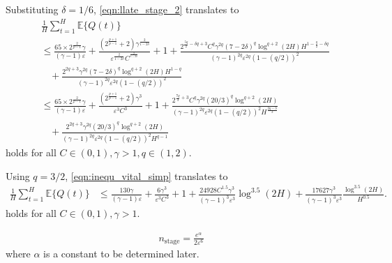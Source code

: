 \documentclass[12pt,draftcls, onecolumn]{IEEEtran}
\begin{document}
Substituting $\delta = 1/6$, \eqref{eqn:llate_stage_2} translates to
\begin{align}\label{eqn:inequ_vital_simp}
    &\frac{1}{H}\sum_{t = 1}^H \mathbb{E}\{Q(t)\} \nonumber\\&\leq  \frac{65\times2^{\frac{2}{p-1}}\gamma }{(\gamma-1) \varepsilon}+\frac{\left(2^{\frac{p+1}{p-1}}+2\right)\gamma^{\frac{2}{1-2\delta}}}{\varepsilon^{\frac{2}{1-2\delta}}C^{^{\frac{2}{1-2\delta}}}}+1 +\frac{2^{\frac{5q}{2}-\delta q+3}C^q\gamma^{2q}(7-2\delta)^q\log^{q+2}(2H)H^{1-\frac{q}{2}-\delta q}}{(\gamma-1)^{2q}\varepsilon^{2q}(1-(q/2))^2}  \nonumber\\&\ \ \ \ + \frac{2^{2q +3}\gamma^{2q}(7-2\delta)^q\log^{q+2}(2H)H^{1-q}}{(\gamma-1)^{2q}\varepsilon^{2q}(1-(q/2))^2} \nonumber\\& \leq \frac{65\times2^{\frac{2}{p-1}}\gamma }{(\gamma-1) \varepsilon}+\frac{\left(2^{\frac{p+1}{p-1}}+2\right)\gamma^{3}}{\varepsilon^{3}C^{3}}+1 +\frac{2^{\frac{7q}{3}+3}C^q\gamma^{2q}(20/3)^q\log^{q+2}(2H)}{(\gamma-1)^{2q}\varepsilon^{2q}(1-(q/2))^2H^{\frac{2q-3}{3}}}  \nonumber\\&\ \ \ \ + \frac{2^{2q +3}\gamma^{2q}(20/3)^q\log^{q+2}(2H)}{(\gamma-1)^{2q}\varepsilon^{2q}(1-(q/2))^2H^{q-1}}
\end{align}
holds for all $C \in (0,1),\gamma>1 , q \in (1,2)$.

Using $q = 3/2$, \eqref{eqn:inequ_vital_simp} translates to
\begin{align}\label{eqn:bound_2}
 \frac{1}{H}\sum_{t = 1}^H \mathbb{E}\{Q(t)\} &\leq \frac{130\gamma }{(\gamma-1)\varepsilon}+\frac{6\gamma^{3}}{\varepsilon^{3}C^{3}}+1 + \frac{24928C^{1.5}\gamma^{3}}{(\gamma-1)^{3}\varepsilon^{3}}\log^{3.5}(2H) +\frac{17627\gamma^{3}}{(\gamma-1)^{3}\varepsilon^{3}}\frac{\log^{3.5}(2H)}{H^{0.5}}.
\end{align}
holds for all $C \in (0,1),\gamma>1$.
 

\begin{align}\label{eqn:T_def}
n_{\text{stage}} = \frac{e^{\alpha}}{2\varepsilon^{6}}
\end{align}
where $\alpha$ is a constant to be determined later.
\end{document}
